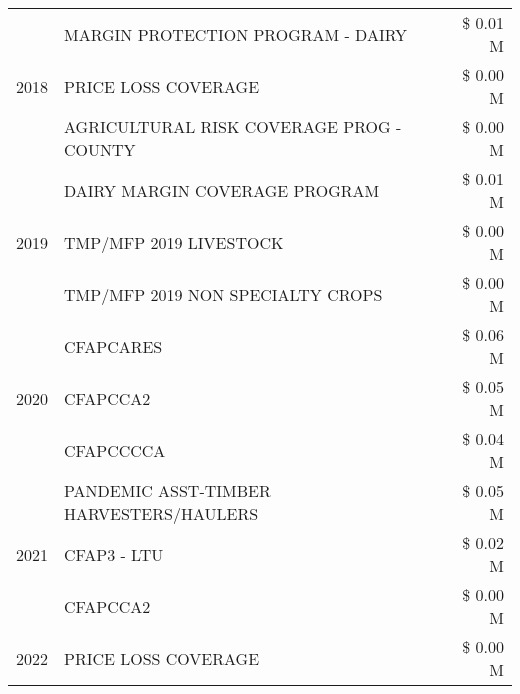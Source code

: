 \begin{tabular}{llr}
\multirow[t]{3}{*}{2018} & MARGIN PROTECTION PROGRAM - DAIRY & \$ 0.01 M \\
 & PRICE LOSS COVERAGE & \$ 0.00 M \\
 & AGRICULTURAL RISK COVERAGE PROG - COUNTY & \$ 0.00 M \\
\cline{1-3}
\multirow[t]{3}{*}{2019} & DAIRY MARGIN COVERAGE PROGRAM & \$ 0.01 M \\
 & TMP/MFP 2019 LIVESTOCK & \$ 0.00 M \\
 & TMP/MFP 2019 NON SPECIALTY CROPS & \$ 0.00 M \\
\cline{1-3}
\multirow[t]{3}{*}{2020} & CFAPCARES & \$ 0.06 M \\
 & CFAPCCA2 & \$ 0.05 M \\
 & CFAPCCCCA & \$ 0.04 M \\
\cline{1-3}
\multirow[t]{3}{*}{2021} & PANDEMIC ASST-TIMBER HARVESTERS/HAULERS & \$ 0.05 M \\
 & CFAP3 - LTU & \$ 0.02 M \\
 & CFAPCCA2 & \$ 0.00 M \\
\cline{1-3}
2022 & PRICE LOSS COVERAGE & \$ 0.00 M \\
\cline{1-3}
\bottomrule
\end{tabular}
